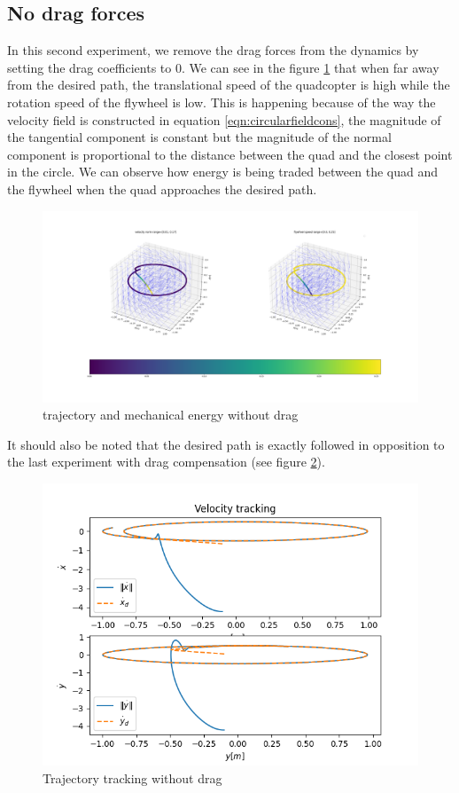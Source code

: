 \subsection{No drag forces}
In this second experiment, we remove the drag forces from the dynamics by setting the drag coefficients to 0.
We can see in the figure \ref{fig:pythonnodrag} that when far away from the desired path, the translational speed of the quadcopter is high while the rotation speed of the flywheel is low.
This is happening because of the way the velocity field is constructed in equation \ref{eqn:circularfieldcons}, 
the magnitude of the tangential component is constant but the magnitude of the normal component is proportional to the distance between the quad and the closest point in the circle.
We can observe how energy is being traded between the quad and the flywheel when the quad approaches the desired path.
\begin{figure}[h!]
   \centering
   \includegraphics[width=\linewidth]{Images/python-nodrag.png}
   \caption{trajectory and mechanical energy without drag }
   \label{fig:pythonnodrag}
\end{figure}
It should also be noted that the desired path is exactly followed in opposition to the last experiment with drag compensation (see figure \ref{fig:trajtracknodrag}).
\begin{figure}[h!]
   \centering
   \includegraphics[width=\linewidth]{Images/velocitytrackingpythonnodrag.png}
   \caption{Trajectory tracking without drag}
   \label{fig:trajtracknodrag}
\end{figure}
